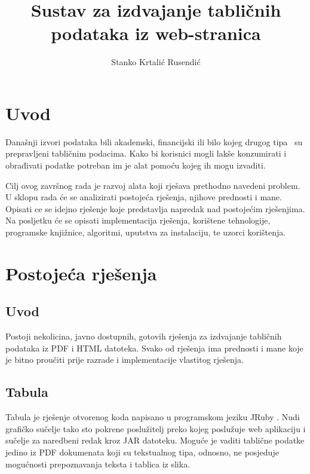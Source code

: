 \documentclass[times, utf8, zavrsni]{fer}
\begin{document}

\title{Sustav za izdvajanje tabličnih podataka iz web-stranica}

\author{Stanko Krtalić Rusendić}

\maketitle


\tableofcontents

\chapter{Uvod}

Današnji izvori podataka bili akademski, financijski ili bilo kojeg drugog tipa
 su prepravljeni tabličnim podacima. Kako bi korisnici mogli lakše konzumirati
i obrađivati podatke potreban im je alat pomoću kojeg ih mogu izvaditi.

Cilj ovog završnog rada je razvoj alata koji rješava prethodno navedeni problem.
U sklopu rada će se analizirati postojeća rješenja, njihove prednosti i mane.
Opisati ce se idejno rješenje koje predstavlja napredak nad postojećim
rješenjima. Na posljetku će se opisati implementacija rješenja, korištene
tehnologije, programske knjižnice, algoritmi, uputstva za instalaciju, te
uzorci korištenja.



\chapter{Postojeća rješenja}

\section{Uvod}

Postoji nekolicina, javno dostupnih, gotovih rješenja za izdvajanje tabličnih
podataka iz PDF \cite{pdf_documentation}
i HTML \cite{html_documentation}
datoteka. Svako od rješenja ima prednosti i mane koje je
bitno proučiti prije razrade i implementacije vlastitog rješenja.

\section{Tabula}

Tabula \cite{tabula_repository} je rješenje otvorenog koda napisano u
programskom jeziku JRuby \cite{jruby_documentation}.
Nudi grafičko sučelje tako sto pokrene poslužitelj preko kojeg poslužuje web
aplikaciju i sučelje za naredbeni redak kroz
JAR \cite{java_language_specification} datoteku. Moguće je vaditi
tablične podatke jedino iz PDF dokumenata koji su tekstualnog tipa, odnosno,
ne posjeduje mogućnosti prepoznavanja teksta i tablica iz slika.
\end{document}

